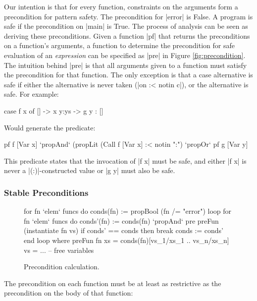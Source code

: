 \documentclass[preprint]{sigplanconf}
\begin{document}
Our intention is that for every function, constraints on the arguments form a precondition for pattern safety. The precondition for |error| is False. A program is safe if the precondition on |main| is True. The process of analysis can be seen as deriving these preconditions. Given a function |pf| that returns the preconditions on a function's arguments, a function to determine the precondition for safe evaluation of an \textit{expression} can be specified as |pre| in Figure \ref{fig:precondition}. The intuition behind |pre| is that all arguments given to a function must satisfy the precondition for that function. The only exception is that a case alternative is safe if either the alternative is never taken (|on :< notin c|), or the alternative is safe. For example:

\begin{code}
case f x of
   []    -> x 
   y:ys  -> g y : []
\end{code}

\noindent Would generate the predicate:

\begin{code}
pf f [Var x] `propAnd` (propLit (Call f [Var x] :< notin ":") `propOr` pf g [Var y]
\end{code}

This predicate states that the invocation of |f x| must be safe, and either |f x| is never a |(:)|-constructed value or |g y| must also be safe.


\subsubsection{Stable Preconditions}
\label{sec:fixp_precond}

\begin{figure}
\ignore\begin{code}
for fn `elem` funcs do conds(fn) := propBool (fn /= "error")
loop
    for fn `elem` funcs do
        conds'(fn) := conds(fn) `propAnd` pre preFun (instantiate fn vs)
    if conds' == conds then break
    conds := conds'
end loop
    where
        preFun fn xs = conds(fn)[vs_1/xs_1 .. vs_n/xs_n]
        vs = ... -- free variables
\end{code}
\caption{Precondition calculation.}
\label{fig:precond_fixp}
\end{figure}

The precondition on each function must be at least as restrictive as the precondition on the body of that function:

\begin{comment}
\begin{code}
preFun :: PreFun
\end{code}
\end{comment}
\end{document}
